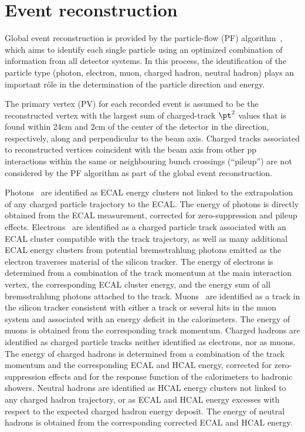\section{Event reconstruction}
\label{sec:event_reconstruction}


Global event reconstruction is provided by the particle-flow (PF)
algorithm~\cite{CMS-PAS-PFT-09-001,CMS-PAS-PFT-10-001}, which aims to
identify each single particle using an optimized combination of
information from all detector systems. In this process, the
identification of the particle type (photon, electron, muon, charged
hadron, neutral hadron) plays an important r\^ole in the determination
of the particle direction and energy.

The primary vertex (PV) for each recorded event is assumed to be the
reconstructed vertex with the largest sum of charged-track $\pt^2$
values that is found within 24\unit{cm} and 2\unit{cm} of the center
of the detector in the direction, respectively, along and
perpendicular to the beam axis. Charged tracks associated to
reconstructed vertices coincident with the beam axis from other pp
interactions within the same or neighbouring bunch crossings
(``pileup'') are not considered by the PF algorithm as part of the
global event reconstruction.

Photons~\cite{CMS:EGM-14-001} are identified as ECAL energy clusters
not linked to the extrapolation of any charged particle trajectory to
the ECAL. The energy of photons is directly obtained from the ECAL
measurement, corrected for zero-suppression and pileup effects.
Electrons~\cite{Khachatryan:2015hwa} are identified as a charged
particle track associated with an ECAL cluster compatible with the
track trajectory, as well as many additional ECAL energy clusters from
potential bremsstrahlung photons emitted as the electron traverses
material of the silicon tracker. The energy of electrons is determined
from a combination of the track momentum at the main interaction
vertex, the corresponding ECAL cluster energy, and the energy sum of
all bremsstrahlung photons attached to the track.
Muons~\cite{Chatrchyan:2012xi} are identified as a track in the
silicon tracker consistent with either a track or several hits in the
muon system and associated with an energy deficit in the calorimeters.
The energy of muons is obtained from the corresponding track momentum.
Charged hadrons are identified as charged particle tracks neither
identified as electrons, nor as muons. The energy of charged hadrons
is determined from a combination of the track momentum and the
corresponding ECAL and HCAL energy, corrected for zero-suppression
effects and for the response function of the calorimeters to hadronic
showers. Neutral hadrons are identified as HCAL energy clusters not
linked to any charged hadron trajectory, or as ECAL and HCAL energy
excesses with respect to the expected charged hadron energy deposit.
The energy of neutral hadrons is obtained from the corresponding
corrected ECAL and HCAL energy.

